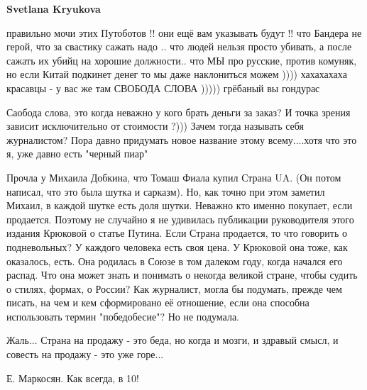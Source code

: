 \begin{itemize}
\begin{itemize}
 
\textbf{Svetlana Kryukova} 

правильно мочи этих Путоботов !! они ещё вам указывать будут !! что Бандера не
герой, что за свастику сажать надо .. что людей нельзя просто убивать, а после
сажать их убийц на хорошие должности.. что МЫ про русские, против комуняк, но
если Китай подкинет денег то мы даже наклониться можем )))) хахахахаха красавцы
- у вас же там СВОБОДА СЛОВА ))))) грёбаный вы гондурас

 

Саобода слова, это когда неважно у кого брать деньги за заказ? И точка зрения
зависит исключительно от стоимости ?))) Зачем тогда называть себя журналистом?
Пора давно придумать новое название этому всему....хотя что это я, уже давно
есть "черный пиар"


 

Прочла у Михаила Добкина, что Томаш Фиала купил Страна UA. (Он потом написал,
что это была шутка и сарказм). Но, как точно при этом заметил Михаил, в каждой
шутке есть доля шутки. Неважно кто именно покупает, если продается. Поэтому не
случайно я не удивилась публикации руководителя этого издания Крюковой о статье
Путина. Если Страна продается, то что говорить о подневольных? У каждого
человека есть своя цена. У Крюковой она тоже, как оказалось, есть. Она родилась
в Союзе в том далеком году, когда начался его распад. Что она может знать и
понимать о некогда великой стране, чтобы судить о стилях, формах, о России? Как
журналист, могла бы подумать, прежде чем писать, на чем и кем сформировано её
отношение, если она способна использовать термин "победобесие"? Но не подумала.

Жаль... Страна на продажу - это беда, но когда и мозги, и здравый смысл, и
совесть на продажу - это уже горе...

Е. Маркосян. Как всегда, в 10!


\end{itemize}
\end{itemize}

